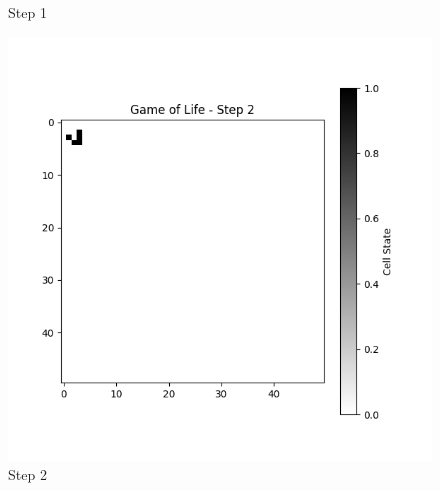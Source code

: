 \documentclass[10pt,letterpaper, onecolumn]{report}
\begin{document}
\begin{flushleft}
\begin{flushleft}
\begin{figure}[htbp!]
\begin{minipage}{0.3\textwidth}
                            \caption{Step 1}
                        \end{minipage}%
                        \begin{minipage}{0.3\textwidth}
                            \centering
                            \includegraphics[width=\textwidth]{../game_of_life_step_Game of Life - Step 2}
                            \caption{Step 2}
                        \end{minipage}
                        \vspace{0.5cm} %
                    

\end{figure}
\end{flushleft}
\end{flushleft}
\end{document}

